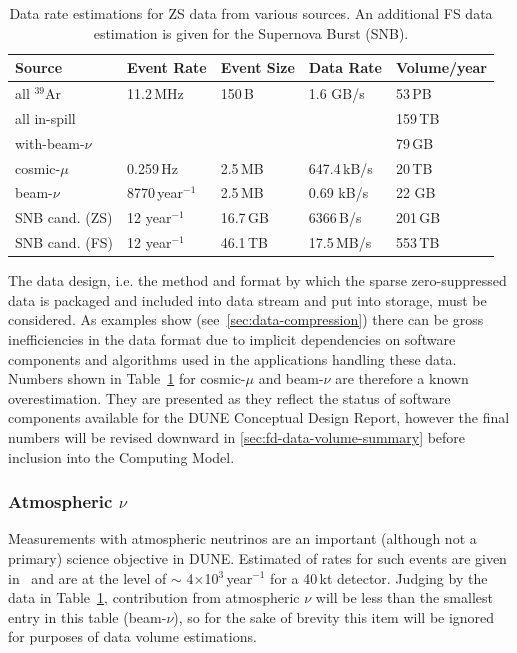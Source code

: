 \begin{table}[ht!]
\centering
\begin{tabular}{| p{1.2in} | p{0.9in} | p{0.75in} | p{0.8in} | p{0.9in} |}		\hline		
Source & Event Rate & Event Size & Data Rate & Volume/year \\ \hline
all $^{39}$Ar & 11.2\,MHz & 150\,B & 1.6 GB/s &  53\,PB \\ \hline
all in-spill & & & & 159\,TB \\ \hline
with-beam-$\nu$ & & & & 79\,GB \\ \hline \hline
cosmic-$\mu$ & 0.259\,Hz &2.5\,MB & 647.4\,kB/s & 20\,TB \\	\hline
beam-$\nu$ & 8770\,year$^{-1}$ & 2.5\,MB & 0.69 kB/s & 22 GB \\ \hline \hline
SNB cand. (ZS) & 12 year$^{-1}$ & 16.7\,GB & 6366\,B/s & 201\,GB \\ \hline
SNB cand. (FS) & 12 year$^{-1}$ & 46.1\,TB & 17.5\,MB/s & 553\,TB \\ \hline
\end{tabular}
\caption{Data rate estimations for ZS data from various sources.
An additional FS data estimation is given for the Supernova Burst (SNB).}
\label{tab:zs-volume}
\end{table}

The data design, i.e. the method and format by which the sparse zero-suppressed data is packaged and included into
data stream and put into storage, must be considered.
As examples show (see~\ref{sec:data-compression})
there can be gross inefficiencies in the data format due to implicit dependencies
on software components and algorithms used in the applications handling these data.
Numbers shown in Table~\ref{tab:zs-volume} for cosmic-$\mu$ and beam-$\nu$
are therefore a known overestimation. They are presented as they reflect the status
of software components available for the DUNE Conceptual Design Report,
however the final numbers will be revised downward in \ref{sec:fd-data-volume-summary}
before inclusion into the Computing Model.

\subsubsection{Atmospheric $\nu$}
\label{sec:atmo-nu}
Measurements with atmospheric neutrinos are an important (although not a primary) science objective in DUNE.
Estimated of rates for such events are given in~\cite{sciopps,cdr_vol2} and are at the level of $\sim$
4$\times$10$^3$\,year$^{-1}$ for a 40\,kt detector. Judging by the data in Table~\ref{tab:zs-volume},
contribution from atmospheric $\nu$ will be less than the smallest entry in this table \mbox{(beam-$\nu$)}, so for the sake
of brevity this item will be ignored for purposes of data volume estimations.

